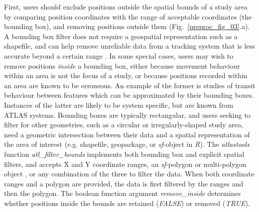     First, users should exclude positions outside the spatial bounds of a study area by comparing position coordinates with the range of acceptable coordinates (the bounding box), and removing positions outside them (Fig.~\ref{preproc_fig_03}.a). 
    A bounding box filter does not require a geospatial representation such as a shapefile, and can help remove unreliable data from a tracking system that is less accurate beyond a certain range \citep[][]{beardsworth2021}.
    In some special cases, users may wish to remove positions \textit{inside} a bounding box, either because movement behaviour within an area is not the focus of a study, or because positions recorded within an area are known to be erroneous.
    An example of the former is studies of transit behaviour between features which can be approximated by their bounding boxes. 
    Instances of the latter are likely to be system specific, but are known from ATLAS systems. 
    Bounding boxes are typically rectangular, and users seeking to filter for other geometries, such as a circular or irregularly-shaped study area, need a geometric intersection between their data and a spatial representation of the area of interest (e.g. shapefile, geopackage, or \textit{sf}-object in \textit{R}).
    The \textit{atlastools} function \textit{atl\_filter\_bounds} implements both bounding box and explicit spatial filters, and accepts X and Y coordinate ranges, an \textit{sf}-polygon or multi-polygon object \citep{pebesma2018}, or any combination of the three to filter the data.
    When both coordinate ranges and a polygon are provided, the data is first filtered by the ranges and then the polygon.
    The boolean function argument \textit{remove\_inside} determines whether positions inside the bounds are retained (\textit{FALSE}) or removed (\textit{TRUE}).


